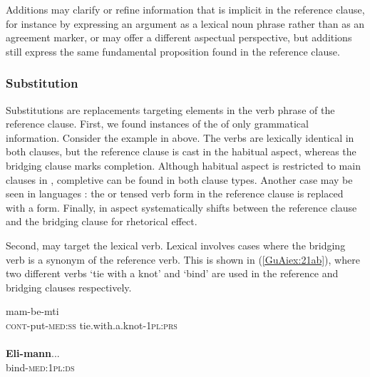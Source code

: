 \documentclass[output=paper]{LSP/langsci}
\begin{document}
Additions may clarify or refine information that is implicit in the reference clause, for instance by expressing an argument as a lexical noun phrase rather than as an agreement marker, or may offer a different aspectual perspective, but additions still express the same fundamental proposition found in the reference clause.

\subsubsection{Substitution}
\label{GuAi314subst}
Substitutions are replacements targeting elements in the verb phrase of the reference clause. First, we found instances of the  of only grammatical information. Consider the  example in  above. The verbs are lexically identical in both clauses, but the reference clause is cast in the habitual aspect, whereas the bridging clause marks completion. Although habitual aspect is restricted to main clauses in , completive can be found in both clause types. Another case may be seen in  languages : the  or tensed verb form in the reference clause is replaced with a  form. Finally, in   aspect systematically shifts between the reference clause and the bridging clause for rhetorical effect.

Second,  may target the lexical verb. Lexical  involves cases where the bridging verb is a synonym of the reference verb. This is shown in (\ref{GuAiex:21ab}), where two different verbs `tie with a knot' and `bind' are used in the reference and bridging clauses respectively. 

\begin{exe}
\ex \label{GuAiex:21ab}
\begin{xlist}
\ex \label{GuAiex:21a}
\gll mam-be-mti     \underline{}\\
\textsc{cont}-put-\textsc{med:ss}   tie.with.a.knot-\textsc{1pl:prs} \\
\glt {} \\
\ex \label{GuAiex:21b}
\gll  \textbf{Eli-mann}...\\
bind-\textsc{med:1pl:ds}\\
\glt {}
\end{xlist}
\end{exe}
\end{document}
